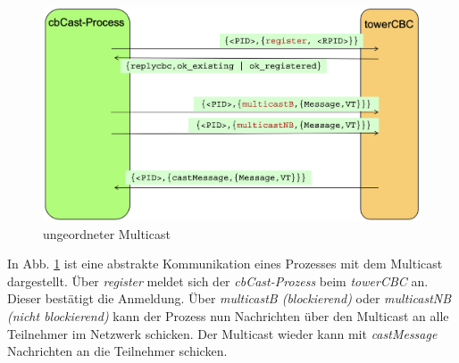 \begin{figure}[htbp]
\begin{center}
\includegraphics[scale=0.4]{Latex/Bilder/towerCBC_1.png}
\caption{\label{fig:towerCBC} ungeordneter Multicast \cite{Aufgabenstellung}} 
\end{center}
\end{figure}

In Abb. \ref{fig:towerCBC} ist eine abstrakte Kommunikation eines Prozesses mit dem Multicast dargestellt. Über \textit{register} meldet sich der \textit{cbCast-Prozess} beim \textit{towerCBC} an. Dieser bestätigt die Anmeldung. Über \textit{multicastB (blockierend)} oder \textit{multicastNB (nicht blockierend)} kann der Prozess nun Nachrichten über den Multicast an alle Teilnehmer im Netzwerk schicken. Der Multicast wieder kann mit \textit{castMessage} Nachrichten an die Teilnehmer schicken.

